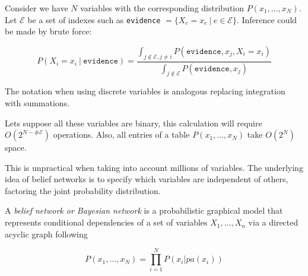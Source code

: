 Consider we have \(N\) variables with the corresponding distribution
\(P(x_1,\dots,x_N)\). Let \(\mathcal{E}\) be a set of indexes such as \texttt{evidence}
\(=\{X_e = x_e \ | \ e \in \mathcal{E}\}\). Inference could be made by brute
force:

\[
P(X_i = x_i \ | \ \texttt{evidence}) = \frac{ \int_{ j \not \in
\mathcal{E}, j \neq i } P(\texttt{evidence}, x_j, X_i = x_i)}{ \int_{ j
\not \in \mathcal{E} } P(\texttt{evidence}, x_j)}
\]

The notation when using discrete variables is analogous replacing integration
with summations.

Lets suppose all these variables are binary, this calculation will require
\(O(2^{N-\#\mathcal{E}})\) operations. Also, all entries of a table \(P(x_1,\dots,
x_N)\) take \(O(2^N)\) space.

This is unpractical when taking into account millions of variables. The
underlying idea of belief networks is to specify which variables are independent
of others, factoring the joint probability distribution.

\begin{definition}
A \emph{belief network or Bayesian network} is a probabilistic graphical model
that represents conditional dependencies of a set of variables \(X_1,\dots, X_n\) via a directed
acyclic graph following

\[
P(x_1,\dots,x_N) = \prod_{i=1}^{N}P(x_i | pa(x_i))
\]
\end{definition}

\begin{figure}
  \centering
\
\label{fig:relations}
\end{figure}
